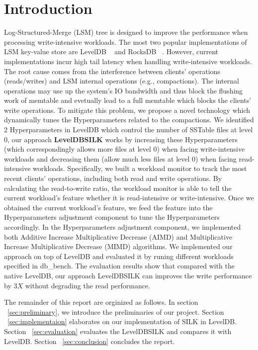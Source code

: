\documentclass[letter,twocolumn,10pt]{article}
\begin{document}
\section{Introduction}
Log-Structured-Merge (LSM) tree is designed to improve the performance when processing write-intensive workloads. The most two popular implementations of LSM key-value store are LevelDB ~\cite{leveldb} and RocksDB ~\cite{rocksdb}. However, current implementations incur high tail latency when handling write-intensive workloads. The root cause comes from the interference between clients' operations (reads/writes) and LSM internal operations (e.g., compactions). The internal operations may use up the system's IO bandwidth and thus block the flushing work of memtable and evetually lead to a full memtable which blocks the clients' write operations. To mitigate this problem, we propose a novel technology which dynamically tunes the Hyperparameters related to the compactions. We identified 2 Hyperparameters in LevelDB which control the number of SSTable files at level 0, our approach \textbf{LevelDBSILK} works by increasing these Hyperparameters (which correspondingly allows more files at level 0) when facing write-intensive workloads and decreasing them (allow much less files at level 0) when facing read-intensive workloads. Specifically, we built a workload monitor to track the most recent clients’ operations, including both read and write operations. By calculating the read-to-write ratio, the workload monitor is able to tell the current workload’s feature whether it is read-intensive or write-intensive. Once we obtained the current workload's feature, we feed the feature into the Hyperparameters adjustment component to tune the Hyperparameters accordingly. In the Hyperparameters adjustment component, we implemented both Additive Increase Multiplicative Decrease (AIMD) and Multiplicative Increase Multiplicative Decrease (MIMD) algorithms. We implemented our approach on top of LevelDB and evaluated it by runing different workloads specified in \textsf{db\_bench}. The evaluation results show that compared with the native LevelDB, our approach LevelDBSILK can improves the write performance by $3X$ without degrading the read performance.

The remainder of this report are orginized as follows. In section ~\ref{sec:preliminary}, we introduce the preliminaries of our project. Section ~\ref{sec:implementaion} elaborates on our implementation of SILK in LevelDB. Section ~\ref{sec:evaluation} evaluates the LevelDBSILK and compares it with LevelDB. Section ~\ref{sec:conclusion} concludes the report.
\end{document}
